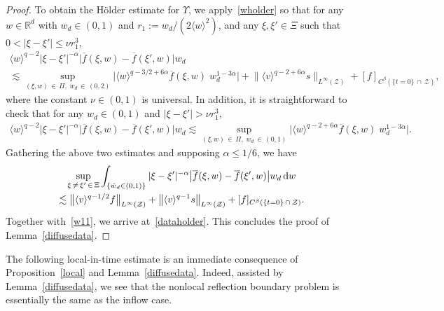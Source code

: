 \documentclass[AHL,Unicode,longabstracts,published]{cedram}
\newcommand*{\dif}{\mathop{}\!\mathrm{d}}
\newcommand*\R {\mathbb{R}}
\newcommand*\Z {\mathcal{Z}}
\newcommand{\la}{\langle}
\newcommand{\ra}{\rangle}
\newcommand{\lv}{\langle v\rangle}
\let\oldhat\hat
\renewcommand*{\hat}[1]{\mathchoice{\widehat{#1}}{\widehat{#1}}{\oldhat{#1}}{\oldhat{#1}}}
\begin{document}
\begin{proof}
To obtain the H\"older estimate for $\Upsilon$, we apply~\eqref{wholder} so that for any $w\in\R^d$ with $w_d\in(0,1)$ and $r_1:=w_d/(2\la w\ra^2)$, and any $\xi,\xi'\in\Xi$ such that $0<|\xi-\xi'|\le \nu r_1^3$,
\begin{multline*}
\la w\ra^{q-2}\left|\xi-\xi'\right|^{-\alpha}\big|\overline{f}(\xi,w)-\overline{f}(\xi',w)\big|w_d\\
\lesssim \sup_{(\xi,w)\,\in\,\Pi,\;\!w_d\,\in\,(0,2)} \big|\la w\ra^{q-3/2+6\alpha}\overline{f}(\xi,w)\;\!w_d^{1-3\alpha}\big| +\big\|\lv^{q-2+6\alpha}s\big\|_{L^\infty(\Z)} + [f]_{C^\beta(\{t=0\}\,\cap\,\Z)},
\end{multline*}
where the constant $\nu\in(0,1)$ is universal. In addition, it is straightforward to check that for any $w_d\in(0,1)$ and $|\xi-\xi'|>\nu r_1^3$,
\begin{align*}
\la w\ra^{q-2}\left|\xi-\xi'\right|^{-\alpha}\big|\overline{f}(\xi,w)-\overline{f}(\xi',w)\big|w_d
\lesssim \sup_{(\xi,w)\,\in\,\Pi,\;\!w_d\,\in\,(0,1)} \big|\la w\ra^{q-2+6\alpha}\overline{f}(\xi,w)\;\!w_d^{1-3\alpha}\big|.
\end{align*}
Gathering the above two estimates and supposing $\alpha\le1/6$, we have
\begin{multline*}
\sup_{\xi\,\neq\,\xi'\,\in\,\Xi}\int_{\left\{\hat{w}_d\in(0,1)\right\}} |\xi-\xi'|^{-\alpha}\big|\overline{f}(\xi,w)-\overline{f}(\xi',w)\big| w_d \dif w\\
\lesssim \big\|\lv^{q-1/2}f\big\|_{L^\infty(\Z)} + \big\|\lv^{q-1}s\big\|_{L^\infty(\Z)} + [f]_{C^\beta(\{t=0\}\,\cap\,\Z)}.
\end{multline*}
Together with~\eqref{w11}, we arrive at~\eqref{dataholder}. This concludes the proof of Lemma~\ref{diffusedata}.
\end{proof}

The following local-in-time estimate is an immediate consequence of Proposition~\ref{local} and Lemma~\ref{diffusedata}. Indeed, assisted by Lemma~\ref{diffusedata}, we see that the nonlocal reflection boundary problem is essentially the same as the inflow case.
\end{document}
